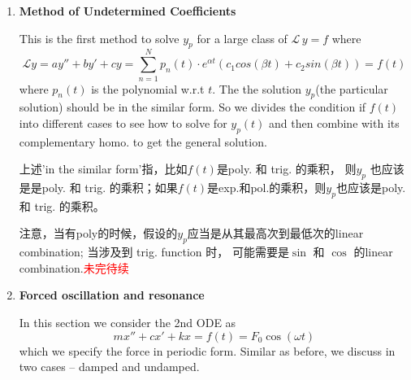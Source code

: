 \documentclass[9pt]{article}
\theoremstyle{definition}
\newenvironment{changemargin}[2]{%
  \begin{list}{}{%
    \setlength{\topsep}{0pt}%
    \setlength{\leftmargin}{#1}%
    \setlength{\rightmargin}{#2}%
    \setlength{\listparindent}{\parindent}%
    \setlength{\itemindent}{\parindent}%
    \setlength{\parsep}{\parskip}%
  }%
  \item[]}{\end{list}}
\theoremstyle{theorem}
\theoremstyle{remark}
\theoremstyle{lemma}
\begin{document}
\begin{changemargin}{-0.125in}{0in}
\begin{enumerate}
        \medskip
        
        \item \textbf{Method of Undetermined Coefficients}
        
        \medskip
        
        This is the first method to solve $y_p$ for a large class of $\mathcal{L}\,y = f$ where 
        \[
        \mathcal{L} y = a y'' + by' + cy = \sum_{n=1}^N p_n(t) \cdot e^{\alpha t}(c_1 cos(\beta t) + c_2 sin(\beta t)) = f(t)
        \]
        where $p_n(t)$ is the polynomial w.r.t $t$. The the solution $y_p$(the particular solution) should be in the similar form. So we divides the condition if $f(t)$ into different cases to see how to solve for $y_p(t)$ and then combine with its complementary homo. to get the general solution. 
        
        \medskip
        
        上述'in the similar form'指，比如$f(t)$是poly. 和 trig. 的乘积， 则$y_p$ 也应该是是poly. 和 trig. 的乘积；如果$f(t)$是exp.和pol.的乘积，则$y_p$也应该是poly. 和 trig. 的乘积。
        
        \medskip
        
        注意，当有poly的时候，假设的$y_p$应当是从其最高次到最低次的linear combination; 当涉及到 trig. function 时， 可能需要是$\sin$ 和 $\cos$ 的linear combination.\textcolor{red}{未完待续}
        
        \medskip
        
%          
%          

        \medskip
        
        \item \textbf{Forced oscillation and resonance}
        
        \medskip
        
        In this section we consider the 2nd ODE as 
        \[
        mx'' + cx' + kx = f(t) = F_0\cos(\omega t)
        \]
        which we specify the force in periodic form. Similar as before, we discuss in two cases -- damped and undamped.
        
        \begin{enumerate}
        

\end{enumerate}
\end{enumerate}
\end{changemargin}
\end{document}
